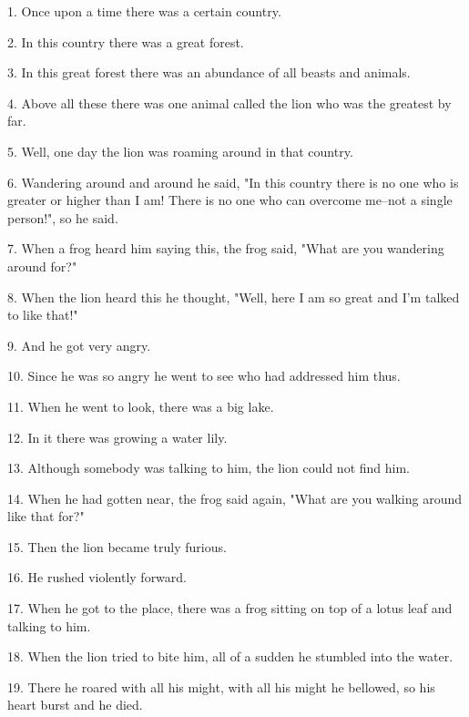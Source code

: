 \setcounter{footnote}{0}

1. Once upon a time there was a certain country.

2. In this country there was a great forest.

3. In this great forest there was an abundance of all beasts and animals.

4. Above all these there was one animal called the lion who was the greatest by
far.

5. Well, one day the lion was roaming around in that country.

6. Wandering around and around he said, "In this country there is no one
who is greater or higher than I am! There is no one who can overcome me--not a
single person!", so he said.

7. When a frog heard him saying this, the frog said, "What are you wandering
around for?"

8. When the lion heard this he thought, "Well, here I am so great and
I'm talked to like that!"

9. And he got very angry.

10. Since he was so angry he went to see who had addressed him thus.

11. When he went to look, there was a big lake.

12. In it there was growing a water lily.

13. Although somebody was talking to him, the lion could not find him.

14. When he had gotten near, the frog said again, "What are you walking
around like that for?"

15. Then the lion became truly furious.

16. He rushed violently forward.

17. When he got to the place, there was a frog sitting on top of a lotus leaf and
talking to him.

18. When the lion tried to bite him, all of a sudden he stumbled into the water.

19. There he roared with all his might, with all his might he bellowed, so his
heart burst and he died.


